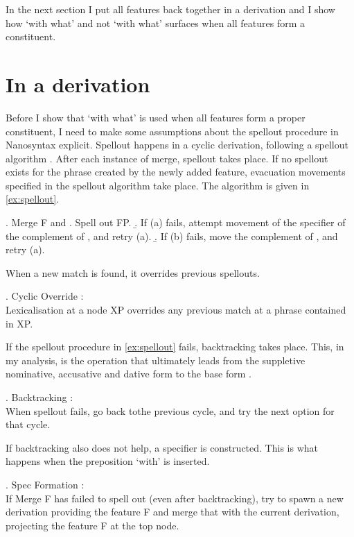 \documentclass[11pt,a4paper]{article}
\begin{document}
In the next section I put all features back together in a derivation and I show how  `with what' and not  `with what' surfaces when all features form a constituent.




\section{In a derivation}\label{sec:derivation}

Before I show that  `with what' is used when all features form a proper constituent, I need to make some assumptions about the spellout procedure in Nanosyntax explicit. Spellout happens in a cyclic derivation, following a spellout algorithm \citep{starke2018}. After each instance of merge, spellout takes place. If no spellout exists for the phrase created by the newly added feature, evacuation movements specified in the spellout algorithm take place. The algorithm is given in \ref{ex:spellout}.

\ex. Merge F and \label{ex:spellout}
 \a. Spell out FP.
 \b. If (a) fails, attempt movement of the specifier of the complement of , and retry (a).
 \b. If (b) fails, move the complement of , and retry (a).

When a new match is found, it overrides previous spellouts.

\ex. Cyclic Override \citep{starke2018}:\\
Lexicalisation at a node XP overrides any previous match at a phrase contained in XP.

If the spellout procedure in \ref{ex:spellout} fails, backtracking takes place. This, in my analysis, is the operation that ultimately leads from the suppletive nominative, accusative and dative form  to the base form .

\ex. Backtracking \citep{starke2018}:\\
When spellout fails, go back tothe previous cycle, and try the next option for that cycle.\label{ex:backtracking}

If backtracking also does not help, a specifier is constructed. This is what happens when the preposition  `with' is inserted.

\ex. Spec Formation \citep{starke2018}:\\
If Merge F has failed to spell out (even after backtracking), try to spawn a new derivation providing the feature F and merge that with the current derivation, projecting the feature F at the top node.\label{ex:specformation}
\end{document}
